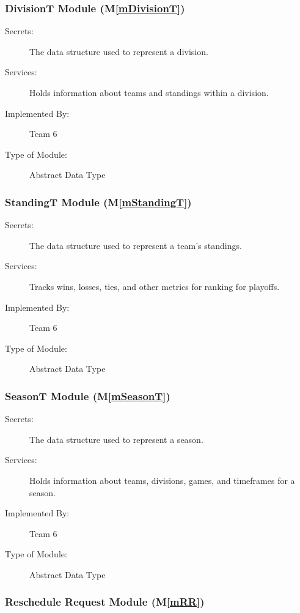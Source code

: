 \documentclass[12pt, titlepage]{article}
\newcommand{\mref}[1]{M\ref{#1}}
\begin{document}
\subsubsection{DivisionT Module (\mref{mDivisionT})}

\begin{description}
  \item[Secrets:] The data structure used to represent a division.
  \item[Services:] Holds information about teams and standings within a division.
  \item[Implemented By:] Team 6
  \item[Type of Module:] Abstract Data Type
\end{description}

\subsubsection{StandingT Module (\mref{mStandingT})}

\begin{description}
  \item[Secrets:] The data structure used to represent a team's standings.
  \item[Services:] Tracks wins, losses, ties, and other metrics for ranking for playoffs.
  \item[Implemented By:] Team 6
  \item[Type of Module:] Abstract Data Type
\end{description}

\subsubsection{SeasonT Module (\mref{mSeasonT})}

\begin{description}
  \item[Secrets:] The data structure used to represent a season.
  \item[Services:] Holds information about teams, divisions, games, and timeframes for a season.
  \item[Implemented By:] Team 6
  \item[Type of Module:] Abstract Data Type
\end{description}

\subsubsection{Reschedule Request Module (\mref{mRR})}
\end{document}
